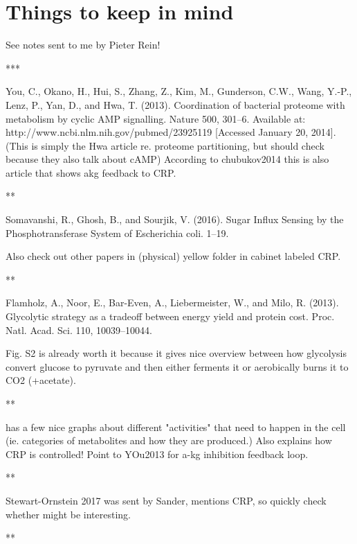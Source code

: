 
\section*{Things to keep in mind}

See notes sent to me by Pieter Rein!

***

\cite{You2013}
You, C., Okano, H., Hui, S., Zhang, Z., Kim, M., Gunderson, C.W., Wang, Y.-P., Lenz, P., Yan, D., and Hwa, T. (2013). Coordination of bacterial proteome with metabolism by cyclic AMP signalling. Nature 500, 301–6. Available at: http://www.ncbi.nlm.nih.gov/pubmed/23925119 [Accessed January 20, 2014].
(This is simply the Hwa article re. proteome partitioning, but should check because they also talk about cAMP)
According to chubukov2014 this is also article that shows akg feedback to CRP.

**

\cite{Somavanshi2016}
Somavanshi, R., Ghosh, B., and Sourjik, V. (2016). Sugar Influx Sensing by the Phosphotransferase System of Escherichia coli. 1–19.

Also check out other papers in (physical) yellow folder in cabinet labeled CRP.

**

\cite{Flamholz2013}
Flamholz, A., Noor, E., Bar-Even, A., Liebermeister, W., and Milo, R. (2013). Glycolytic strategy as a tradeoff between energy yield and protein cost. Proc. Natl. Acad. Sci. 110, 10039–10044.

Fig. S2 is already worth it because it gives nice overview between how glycolysis convert glucose to pyruvate and then either ferments it or aerobically burns it to CO2 (+acetate).

**

\cite{chubukov2014} has a few nice graphs about different "activities" that need to happen in the cell (ie. categories of metabolites and how they are produced.) Also explains how CRP is controlled! Point to YOu2013 for a-kg inhibition feedback loop.

**

Stewart-Ornstein 2017 \cite{Stewart-Ornstein2017} was sent by Sander, mentions CRP, so quickly check whether might be interesting.

**

